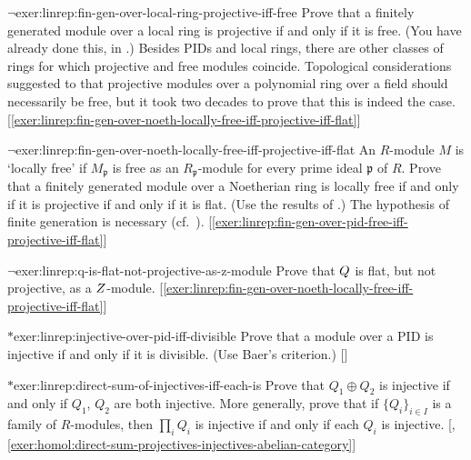 \begin{exer}{$\lnot$}{exer:linrep:fin-gen-over-local-ring-projective-iff-free}
  Prove that a finitely generated module over a local ring is
  projective if and only if it is free. (You have already done this,
  in .)
  Besides PIDs and local rings, there are other classes of rings for
  which projective and free modules coincide.  Topological
  considerations suggested to  that projective modules
  over a polynomial ring over a field should necessarily be free, but
  it took two decades to prove that this is indeed the case.
  [\ref{exer:linrep:fin-gen-over-noeth-locally-free-iff-projective-iff-flat}]
\end{exer}

\begin{exer}{$\lnot$}{exer:linrep:fin-gen-over-noeth-locally-free-iff-projective-iff-flat}
  An $R$-module $M$ is `locally free' if $M_{\mathfrak{p}}$ is free as
  an $R_{\mathfrak{p}}$-module for every prime ideal $\mathfrak{p}$ of
  $R$. Prove that a finitely generated module over a Noetherian ring
  is locally free if and only if it is projective if and only if it is
  flat. (Use the results of
  .)
  The hypothesis
  of finite generation is necessary (cf.\
  ).
  [\ref{exer:linrep:fin-gen-over-pid-free-iff-projective-iff-flat}]
\end{exer}

\begin{exer}{$\lnot$}{exer:linrep:q-is-flat-not-projective-as-z-module}
  Prove that $Q$ is flat, but not projective, as a
  $Z$-module. [\ref{exer:linrep:fin-gen-over-noeth-locally-free-iff-projective-iff-flat}]
\end{exer}

\begin{exer}{$*$}{exer:linrep:injective-over-pid-iff-divisible}
  Prove that a module over a PID is injective if and only if it is
  divisible. (Use Baer's criterion.)
  []
\end{exer}

\begin{exer}{$*$}{exer:linrep:direct-sum-of-injectives-iff-each-is}
  Prove that $Q_1 \oplus Q_2$ is injective if and only if $Q_1$, $Q_2$
  are both injective. More generally, prove that if
  $\{Q_i\}_{i \in I}$ is a family of $R$-modules, then $\prod_i Q_i$
  is injective if and only if each $Q_i$ is injective.
  [,
  \ref{exer:homol:direct-sum-projectives-injectives-abelian-category}]
\end{exer}

